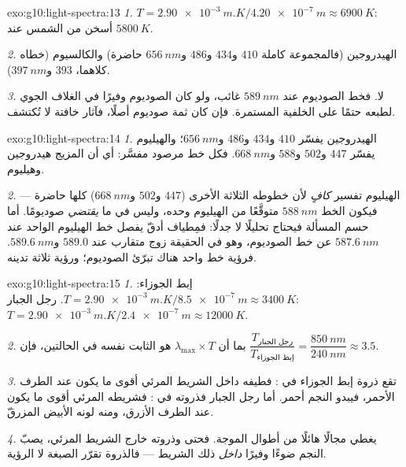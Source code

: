 \begin{solution}{exo:g10:light-spectra:13}
\emph{1.} $T = \qty{2.90e-3}{m.K} / \qty{4.20e-7}{m} \approx
\qty{6900}{K}$: أسخن من الشمس عند $\qty{5800}{K}$.

\emph{2.} الهيدروجين (فالمجموعة كاملة $410$ و$434$ و$486$ و$\qty{656}{nm}$
حاضرة) والكالسيوم (خطاه كلاهما، $393$ و$\qty{397}{nm}$).

\emph{3.} لا. فخط الصوديوم عند $\qty{589}{nm}$ غائب، ولو كان الصوديوم
وفيرًا في الغلاف الجوي لطبعه حتمًا على الخلفية
المستمرة. فإن كان ثمة صوديوم أصلًا، فآثار خافتة لا
تُكتشف.
\end{solution}

\begin{solution}{exo:g10:light-spectra:14}
\emph{1.} الهيدروجين يفسّر $410$ و$434$ و$486$ و$\qty{656}{nm}$؛
والهيليوم يفسّر $447$ و$502$ و$588$ و$\qty{668}{nm}$. فكل خط مرصود
مفسَّر: أي أن المزيج هيدروجين وهيليوم.

\emph{2.} الهيليوم تفسير \emph{كافٍ} لأن خطوطه الثلاثة
الأخرى ($447$ و$502$ و$\qty{668}{nm}$) كلها حاضرة --- فيكون الخط
$\qty{588}{nm}$ متوقَّعًا من الهيليوم وحده، وليس في
 ما \emph{يقتضي} صوديومًا. أما حسم المسألة فيحتاج
تحليلًا لا جدلًا: فمِطياف أدقّ يفصل خط الهيليوم
الواحد عند $\qty{587.6}{nm}$ عن خط الصوديوم، وهو في الحقيقة زوج متقارب عند
$589.0$ و$\qty{589.6}{nm}$. فرؤية خط واحد هناك تبرّئ الصوديوم؛
ورؤية ثلاثة تدينه.
\end{solution}

\begin{solution}{exo:g10:light-spectra:15}
\emph{1.} إبط الجوزاء:
$T = \qty{2.90e-3}{m.K} / \qty{8.5e-7}{m} \approx \qty{3400}{K}$. رجل الجبار:
$T = \qty{2.90e-3}{m.K} / \qty{2.4e-7}{m} \approx \qty{12000}{K}$.

\emph{2.} بما أن $\lambda_{\max} \times T$ هو الثابت نفسه في الحالتين، فإن
$\dfrac{T_{\text{رجل الجبار}}}{T_{\text{إبط الجوزاء}}}
= \dfrac{\qty{850}{nm}}{\qty{240}{nm}} \approx 3.5$.

\emph{3.} تقع ذروة إبط الجوزاء في : فطيفه داخل الشريط
المرئي أقوى ما يكون عند الطرف الأحمر، فيبدو النجم أحمر. أما رجل الجبار
فذروته في : فشريطه المرئي أقوى ما يكون عند الطرف الأزرق، ومنه
لونه الأبيض المزرقّ.

\emph{4.} يغطي  مجالًا هائلًا من أطوال الموجة. فحتى
وذروته خارج الشريط المرئي، يصبّ النجم ضوءًا وفيرًا
\emph{داخل} ذلك الشريط --- فالذروة تقرّر الصبغة لا الرؤية.
\end{solution}

